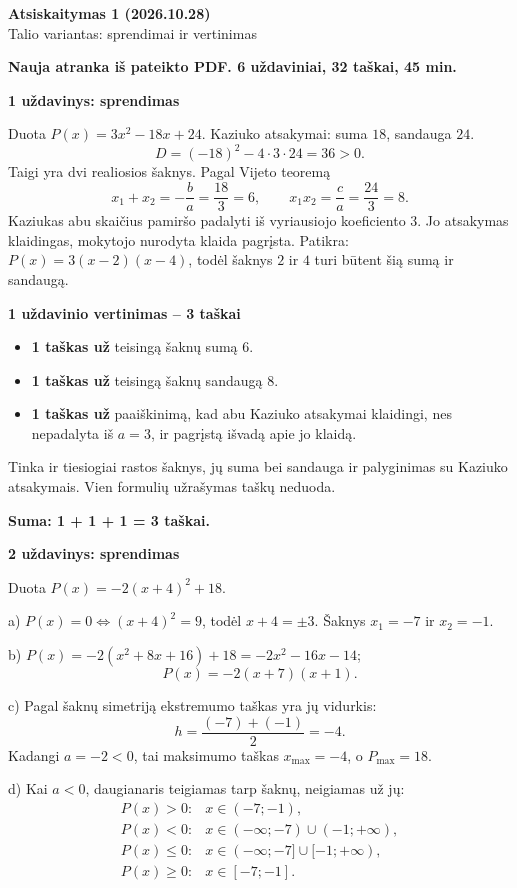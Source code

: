 \documentclass[11pt]{article}
\newcommand{\sk}[1]{\par\medskip\textbf{#1}\par}
\begin{document}
\setlength{\abovedisplayskip}{6pt}\setlength{\belowdisplayskip}{6pt}
\begin{center}\Large\textbf{Atsiskaitymas 1 (2026.10.28)}\\\large Talio variantas: sprendimai ir vertinimas\end{center}
\textbf{Nauja atranka iš pateikto PDF. 6 uždaviniai, 32 taškai, 45 min.}

\sk{1 uždavinys: sprendimas}
Duota $P(x)=3 x^{2} - 18 x + 24$. Kaziuko atsakymai: suma $18$, sandauga $24$.
\[D=(-18)^2-4\cdot3\cdot24=36>0.\]
Taigi yra dvi realiosios šaknys. Pagal Vijeto teoremą
\[x_1+x_2=-\frac ba=\frac{18}3=6,\qquad x_1x_2=\frac ca=\frac{24}3=8.\]
Kaziukas abu skaičius pamiršo padalyti iš vyriausiojo koeficiento $3$. Jo atsakymas klaidingas, mokytojo nurodyta klaida pagrįsta. Patikra: $P(x)=3(x-2)(x-4)$, todėl šaknys $2$ ir $4$ turi būtent šią sumą ir sandaugą.

\sk{1 uždavinio vertinimas -- 3 taškai}
\begin{itemize}
\item \textbf{1 taškas už} teisingą šaknų sumą $6$.
\item \textbf{1 taškas už} teisingą šaknų sandaugą $8$.
\item \textbf{1 taškas už} paaiškinimą, kad abu Kaziuko atsakymai klaidingi, nes nepadalyta iš $a=3$, ir pagrįstą išvadą apie jo klaidą.
\end{itemize}
Tinka ir tiesiogiai rastos šaknys, jų suma bei sandauga ir palyginimas su Kaziuko atsakymais. Vien formulių užrašymas taškų neduoda.\par\textbf{Suma: 1 + 1 + 1 = 3 taškai.}

\sk{2 uždavinys: sprendimas}
Duota $P(x)=-2(x+4)^2+18$.
\par a) $P(x)=0\iff (x+4)^2=9$, todėl $x+4=\pm3$. Šaknys $x_1=-7$ ir $x_2=-1$.
\par b) $P(x)=-2(x^2+8x+16)+18=- 2 x^{2} - 16 x - 14$;
\[P(x)=-2(x+7)(x+1).\]
\par c) Pagal šaknų simetriją ekstremumo taškas yra jų vidurkis:
\[h=\frac{(-7)+(-1)}2=-4.\]
Kadangi $a=-2<0$, tai maksimumo taškas $x_{\max}=-4$, o $P_{\max}=18$.
\par d) Kai $a<0$, daugianaris teigiamas tarp šaknų, neigiamas už jų:
\[\begin{array}{ll}P(x)>0:&x\in(-7;-1),\\P(x)<0:&x\in(-\infty;-7)\cup(-1;+\infty),\\P(x)\le0:&x\in(-\infty;-7]\cup[-1;+\infty),\\P(x)\ge0:&x\in[-7;-1].\end{array}\]
\newpage
\end{document}
